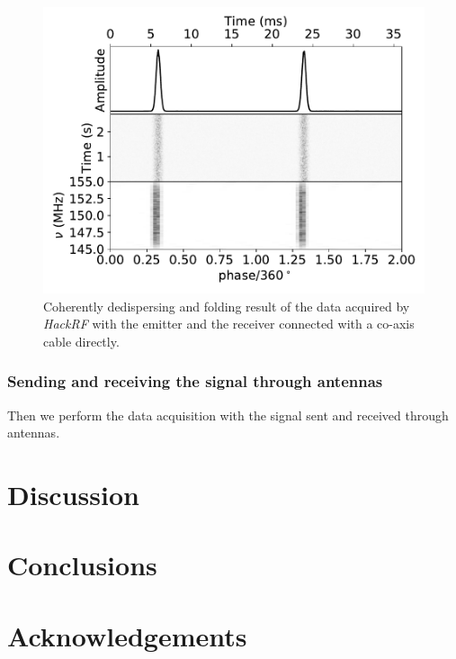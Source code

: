 \documentclass[fleqn,usenatbib]{mnras}
\begin{document}
\begin{figure}
    \centering
    \includegraphics[width=\columnwidth]{cddsp_direct_hackrf_dm100_18.pdf}
    \caption{Coherently dedispersing and folding result of the data acquired by \textit{HackRF} with the emitter and the receiver connected with a co-axis cable directly.}
    \label{fig:cddsp_direct_hackrf_dm100_18}
\end{figure}

\subsubsection{Sending and receiving the signal through antennas}
Then we perform the data acquisition with the signal sent and received through antennas.



\section{Discussion}

\section{Conclusions}

\section*{Acknowledgements}








\bsp	%
\label{lastpage}
\end{document}

